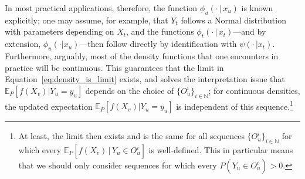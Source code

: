 \documentclass[twoside,11pt]{article}
\newcommand{\nats}{\mathbb{N}}
\newcommand{\states}{\mathcal{X}}
\newcommand{\observs}{\mathcal{Y}}
\newcommand{\lexp}{\underline{\mathbb{E}}_{\rateset,\mathcal{M}}}
\newcommand{\rateset}{\mathcal{Q}}
\begin{document}
In most practical applications, therefore, the function $\phi_u(\cdot\,\vert\,x_u)$ is known explicitly; one may assume, for example, that $Y_t$ follows a Normal distribution with parameters depending on $X_t$, and the functions $\phi_t(\cdot\,\vert\,x_t)$---and by extension, $\phi_u(\cdot\vert x_u)$---then follow directly by identification with $\psi(\cdot\,\vert x_t)$. Furthermore, arguably, most of the density functions that one encounters in practice will be continuous. This guarantees that the limit in Equation~\eqref{eq:density_is_limit} exists, and solves the interpretation issue that $\mathbb{E}_P[f(X_v)\vert Y_u=y_u]$ depends on the choice of $\{O_u^i\}_{i\in\nats}$; for continuous densities, the updated expectation $\mathbb{E}_P[f(X_v)\vert Y_u=y_u]$ is independent of this sequence.\footnote{\label{fnote:extra_condition}At least, the limit then exists and is the same for all sequences $\{O_u^i\}_{i\in\nats}$ for which every $\mathbb{E}_P[f(X_v)\,\vert\,Y_u\in O_u^i]$ is well-defined. This in particular means that we should only consider sequences for which every $P(Y_u\in O_u^i)>0$.}


\end{document}
